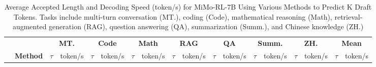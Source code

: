 \documentclass{article} %
\begin{document}

\begin{table}[ht]
\centering
\caption{Average Accepted Length and Decoding Speed (token/s) for MiMo-RL-7B Using Various Methods to Predict K Draft Tokens. Tasks include multi-turn conversation (MT.), coding (Code), mathematical reasoning (Math), retrieval-augmented generation (RAG), question answering (QA), summarization (Summ.), and Chinese knowledge (ZH.)}
\small
\begin{adjustbox}{width=\textwidth}
\label{tab:all}
\begin{tabular}{clcccccccccccccccc}
\toprule
                                  & \multicolumn{1}{c}{}                          & \multicolumn{2}{c}{\textbf{MT.}}                                               & \multicolumn{2}{c}{\textbf{Code}}                                              & \multicolumn{2}{c}{\textbf{Math}}                                              & \multicolumn{2}{c}{\textbf{RAG}}                                               & \multicolumn{2}{c}{\textbf{QA}}                                                & \multicolumn{2}{c}{\textbf{Summ.}}                                             & \multicolumn{2}{c}{\textbf{ZH.}}                                               & \multicolumn{2}{c}{\textbf{Mean}}                                                      \\ \cmidrule{3-18} 
\multirow{-2}{*}{} & \multicolumn{1}{c}{\multirow{-2}{*}{\textbf{Method}}}  & $\tau$                            & token/s                                & $\tau$                            & token/s                                & $\tau$                            & token/s                                & $\tau$                            & token/s                                & $\tau$                            & token/s                                & $\tau$                            & token/s                                & $\tau$                            & token/s                                & $\tau$                            & token/s                              \\ \midrule

\end{tabular}
\end{adjustbox}
\end{table}
\end{document}
